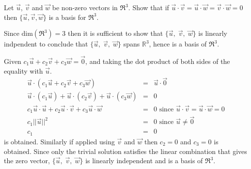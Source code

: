 
\begin{Exercise}[
name={},
title={}, 
difficulty=0,
origin={\cite{BS}}]
Let $\vec{u}$, $\vec{v}$ and $\vec{w}$ be non-zero vectors in $\Re^3$.  Show that if
$\vec{u}\cdot\vec{v}=\vec{u}\cdot\vec{w}=\vec{v}\cdot\vec{w}=0$ then $\{\vec{u}, \vec{v}, \vec{w}\}$ is a basis for $\Re^3$.
\end{Exercise}

\begin{Answer}
Since $\text{dim}(\Re^3)=3$ then it is sufficient to show
that $\{\vec{u},\;\vec{v},\;\vec{w}\}$ is linearly indpendent
to conclude that $\{\vec{u},\;\vec{v},\;\vec{w}\}$ spans $\mathbb{R}^3$,
hence is a basis of $\Re^3$.

Given $c_1\vec{u}+c_2\vec{v}+c_3\vec{w}=\vec{0}$, and taking the dot product
of both sides of the equality with $\vec{u}$.
\begin{eqnarray*}
\vec{u}\cdot(c_1\vec{u}+c_2\vec{v}+c_3\vec{w})&=&\vec{u}\cdot\vec{0}\\
\vec{u}\cdot(c_1\vec{u})+\vec{u}\cdot(c_2\vec{v})+\vec{u}\cdot(c_3\vec{w})&=&0\\
c_1\vec{u}\cdot\vec{u}+c_2\vec{u}\cdot\vec{v}+c_3\vec{u}\cdot\vec{w}&=&0 \text{ since } \vec{u}\cdot\vec{v}=\vec{u}\cdot\vec{w}=0\\
c_1||\vec{u}||^2&=&0 \text{ since }\vec{u}\neq\vec{0}\\
c_1&=& 0
\end{eqnarray*}
is obtained.  Similarly if applied using $\vec{v}$ and $\vec{w}$ then $c_2=0$ and $c_3=0$ is obtained.  Since only the trivial solution satisfies the linear combination that gives the zero vector, $\{\vec{u},\;\vec{v},\;\vec{w}\}$ is linearly independent and is a basis of $\Re^3$.
\end{Answer}
